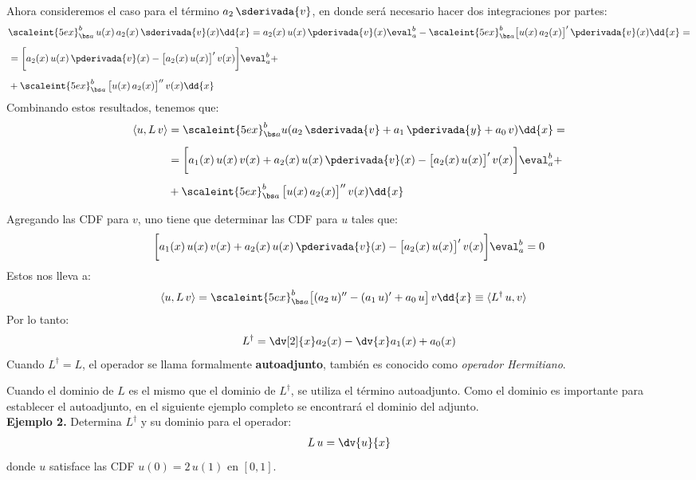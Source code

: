 Ahora consideremos el caso para el término $a_{2} \, \sderivada{v}$, en donde será necesario hacer dos integraciones por partes:
\begin{align}
\begin{aligned}[b]
&\scaleint{5ex}_{\bs a}^{b} \, u(x) \, a_{2} (x) \, \sderivada{v}(x) \dd{x} = a_{2}(x) \, u(x) \, \pderivada{v}(x) \eval_{a}^{b} - \scaleint{5ex}_{\bs a}^{b} \big[ u(x) \, a_{2} (x) \big]^{\prime} \, \pderivada{v}(x) \dd{x} = \\[0.5em]
&= \bigg[ a_{2}(x) \, u(x) \, \pderivada{v}(x) - \big[ a_{2}(x) \, u(x) \big]^{\prime} \, v(x) \bigg] \eval_{a}^{b} + \\[0.5em]
&+ \scaleint{5ex}_{\bs a}^{b} \, \big[ u(x) \, a_{2} (x) \big]^{\prime \prime} \, v(x) \dd{x}
\end{aligned}
\label{eq:ecuacion_04_18}
\end{align}
Combinando estos resultados, tenemos que:
\begin{align}
\begin{aligned}[b]
\langle u , L \, v \rangle &= \scaleint{5ex}_{\bs a}^{b} u (a_{2} \, \sderivada{v} + a_{1} \, \pderivada{y} + a_{0} \, v) \dd{x} = \\[0.5em]
&= \bigg[ a_{1}(x) \, u(x) \, v(x) + a_{2}(x) \, u(x) \, \pderivada{v}(x) - \big[ a_{2}(x) \, u(x) \big]^{\prime} \, v(x) \bigg] \eval_{a}^{b} + \\[0.5em]
&+ \scaleint{5ex}_{\bs a}^{b} \, \big[ u(x) \, a_{2} (x) \big]^{\prime \prime} \, v(x) \dd{x}
\end{aligned}
\label{eq:ecuacion_04_19}
\end{align}

Agregando las CDF para $v$, uno tiene que determinar las CDF para $u$ tales que:
\begin{align*}
\bigg[ a_{1}(x) \, u(x) \, v(x) + a_{2}(x) \, u(x) \, \pderivada{v}(x) - \big[ a_{2}(x) \, u(x) \big]^{\prime} \, v(x) \bigg] \eval_{a}^{b} = 0
\end{align*}
Estos nos lleva a:
\begin{align*}
\langle u , L \, v \rangle &= \scaleint{5ex}_{\bs a}^{b}  \big[ (a_{2} \, u)^{\prime \prime} - (a_{1} \, u)^{\prime} + a_{0} \, u \big] \, v \dd{x} \equiv \langle L^{\dagger} \, u, v \rangle 
\end{align*}
Por lo tanto:
\begin{align}
L^{\dagger} = \dv[2]{x} a_{2}(x) - \dv{x} a_{1}(x) + a_{0}(x)
\label{eq:ecuacion_04_20}
\end{align}
Cuando $L^{\dagger} = L$, el operador se llama formalmente \textbf{autoadjunto}, también es conocido como \emph{operador Hermitiano}.
\par
Cuando el dominio de $L$ es el mismo que el dominio de $L^{\dagger}$, se utiliza el término autoadjunto. Como el dominio es importante para establecer el autoadjunto, en el siguiente ejemplo completo se encontrará el dominio del adjunto.
\\[0.5em]
\noindent
\textbf{Ejemplo 2.} Determina $L^{\dagger}$ y su dominio para el operador:
\begin{align*}
L \, u = \dv{u}{x}
\end{align*}
donde $u$ satisface las CDF $u(0) = 2 \, u(1)$ en $[0, 1]$.

